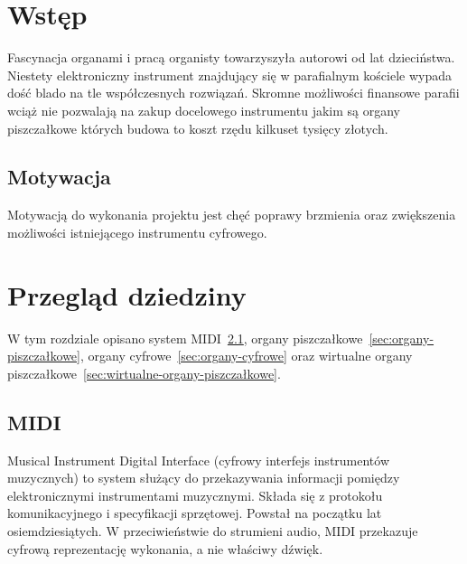 \documentclass[11pt]{report}
\begin{document}
    \begin{titlepage}
        \centering
        \vspace{0.05\textheight}
        \vspace{0.06\textheight}
        \vspace{0.5\textheight}
        \vspace{0.03\textheight}
    \end{titlepage}

    \tableofcontents


    \chapter{Wstęp}\label{ch:wstęp}
    Fascynacja organami i pracą organisty towarzyszyła autorowi od lat dzieciństwa.
    Niestety elektroniczny instrument znajdujący się w parafialnym kościele wypada dość blado na tle współczesnych rozwiązań.
    Skromne możliwości finansowe parafii wciąż nie pozwalają na zakup docelowego instrumentu jakim są organy piszczałkowe których budowa to koszt rzędu kilkuset tysięcy złotych.


    \section{Motywacja}
    Motywacją do wykonania projektu jest chęć poprawy brzmienia oraz zwiększenia możliwości istniejącego instrumentu cyfrowego.


    \chapter{Przegląd dziedziny}
    W tym rozdziale opisano system MIDI~\ref{sec:midi}, organy piszczałkowe~\ref{sec:organy-piszczałkowe}, organy cyfrowe~\ref{sec:organy-cyfrowe}
    oraz wirtualne organy piszczałkowe~\ref{sec:wirtualne-organy-piszczałkowe}.


    \section{MIDI}\label{sec:midi}
    Musical Instrument Digital Interface (cyfrowy interfejs instrumentów muzycznych) to system służący do przekazywania informacji pomiędzy elektronicznymi instrumentami muzycznymi.
    Składa się z protokołu komunikacyjnego i specyfikacji sprzętowej.
    Powstał na początku lat osiemdziesiątych.
    W przeciwieństwie do strumieni audio, MIDI przekazuje cyfrową reprezentację wykonania, a nie właściwy dźwięk.
\end{document}
